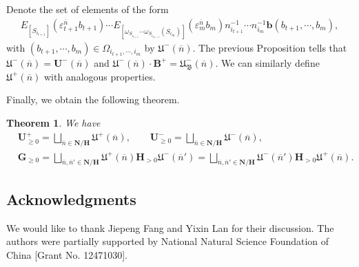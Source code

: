 \documentclass[12pt]{amsart}
\newtheorem{theorem}{Theorem}[section]
\begin{document}
Denote the set of elements of the form
\begin{align*}
        E_{[S_{i_{t+1}}]}(\varepsilon_{t+1}^{\overline{n}}b_{t+1})  \cdots E_{[\omega_{S_{i_{t+1}}}\cdots\omega_{S_{i_{m-1}}}(S_{i_m})]}(\varepsilon_m^{\overline{n}}b_m)n_{i_{t+1}}^{-1}\cdots n_{i_m}^{-1} \mathbf{b}(b_{t+1},\cdots,b_m), 
\end{align*}
with $ (b_{t+1},\cdots,b_m)\in \Omega_{i_{t+1},\cdots,i_m} $ by $\mathfrak{U}^-(\overline{n})$.
The previous Proposition tells that $\mathfrak{U}^-(\overline{n})=\mathbf{U}^-(\overline{n})$ and $\mathfrak{U}^-(\overline{n})\cdot \mathbf{B}^+ = \mathfrak{U}^-_{\mathfrak{B}}(\overline{n})$.
We can similarly define $\mathfrak{U}^+(\overline{n})$ with analogous properties.

Finally, we obtain the following theorem.


\begin{theorem}
    We have 
    \begin{align*}
   &\mathbf{U}^+_{\geq 0}=\bigsqcup_{\overline{n}\in \mathbf{N}/\mathbf{H}} \mathfrak{U}^+(\overline{n}), \qquad 
    \mathbf{U}^-_{\geq 0}=\bigsqcup_{\overline{n}\in \mathbf{N}/\mathbf{H}} \mathfrak{U}^-(\overline{n}),\\
    &\mathbf{G}_{\geq 0}=\bigsqcup_{\overline{n},\overline{n}'\in \mathbf{N}/\mathbf{H}} \mathfrak{U}^+(\overline{n})\mathbf{H}_{>0}\mathfrak{U}^-(\overline{n}')=\bigsqcup_{\overline{n},\overline{n}'\in \mathbf{N}/\mathbf{H}}\mathfrak{U}^-(\overline{n}')\mathbf{H}_{>0}\mathfrak{U}^+(\overline{n}).
\end{align*}
\end{theorem}




\subsection*{Acknowledgments}
We would like to thank Jiepeng Fang and Yixin Lan for their discussion.
The authors were partially supported by National Natural Science Foundation of China [Grant No. 12471030].
\end{document}
